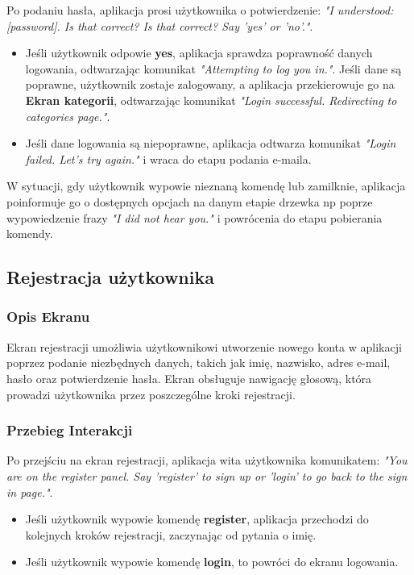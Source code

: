 Po podaniu hasła, aplikacja prosi użytkownika o potwierdzenie: \textit{"I understood: [password]. Is that correct? Is that correct? Say 'yes' or 'no'."}.

\begin{itemize}
    \item Jeśli użytkownik odpowie \textbf{yes}, aplikacja sprawdza poprawność danych logowania, odtwarzając komunikat \textit{"Attempting to log you in."}. Jeśli dane są poprawne, użytkownik zostaje zalogowany, a aplikacja przekierowuje go na \textbf{Ekran kategorii}, odtwarzając komunikat \textit{"Login successful. Redirecting to categories page."}.
    \item Jeśli dane logowania są niepoprawne, aplikacja odtwarza komunikat \textit{"Login failed. Let's try again."} i wraca do etapu podania e-maila.
\end{itemize}


W sytuacji, gdy użytkownik wypowie nieznaną komendę lub zamilknie, aplikacja poinformuje go o dostępnych opcjach na danym etapie drzewka np poprze wypowiedzenie frazy \textit{"I did not hear you."} i powrócenia do etapu pobierania komendy.

\subsection{Rejestracja użytkownika}

\subsubsection{Opis Ekranu}

Ekran rejestracji umożliwia użytkownikowi utworzenie nowego konta w aplikacji poprzez podanie niezbędnych danych, takich jak imię, nazwisko, adres e-mail, hasło oraz potwierdzenie hasła. Ekran obsługuje nawigację głosową, która prowadzi użytkownika przez poszczególne kroki rejestracji.

\subsubsection{Przebieg Interakcji}

Po przejściu na ekran rejestracji, aplikacja wita użytkownika komunikatem: 
\textit{"You are on the register panel. Say 'register' to sign up or 'login' to go back to the sign in page."}.

\begin{itemize}
    \item Jeśli użytkownik wypowie komendę \textbf{register}, aplikacja przechodzi do kolejnych kroków rejestracji, zaczynając od pytania o imię.
    \item Jeśli użytkownik wypowie komendę \textbf{login}, to powróci do ekranu logowania.
\end{itemize}

